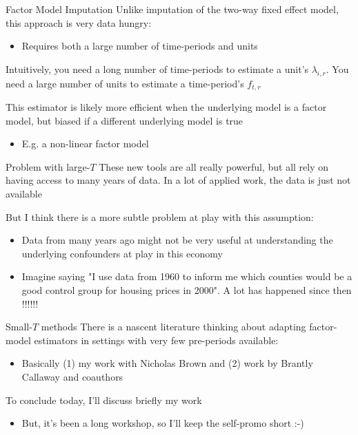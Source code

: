 \documentclass[t]{beamer}
\begin{document}
\begin{frame}{Factor Model Imputation}
  Unlike imputation of the two-way fixed effect model, this approach is very data hungry:
  \begin{itemize}
    \item Requires both a large number of time-periods and units
  \end{itemize}

  \bigskip
  Intuitively, you need a long number of time-periods to estimate a unit's $\lambda_{i,r}$. You need a large number of units to estimate a time-period's $f_{t,r}$

  \pause
  \bigskip
  This estimator is likely more efficient when the underlying model is a factor model, but biased if a different underlying model is true
  \begin{itemize}
    \item E.g. a non-linear factor model
  \end{itemize}
\end{frame}

\begin{frame}{Problem with large-$T$}
  These new tools are all really powerful, but all rely on having access to many years of data.
  In a lot of applied work, the data is just not available

  \pause
  \bigskip
  But I think there is a more subtle problem at play with this assumption:
  \begin{itemize}
    \item Data from many years ago might not be very useful at understanding the underlying confounders at play in this economy
    \item Imagine saying "I use data from 1960 to inform me which counties would be a good control group for housing prices in 2000". A lot has happened since then !!!!!!
  \end{itemize}
\end{frame}

\begin{frame}{Small-$T$ methods}
  There is a nascent literature thinking about adapting factor-model estimators in settings with very few pre-periods available:
  \begin{itemize}
    \item Basically (1) my work with Nicholas Brown and (2) work by Brantly Callaway and coauthors
  \end{itemize}

  \bigskip
  To conclude today, I'll discuss briefly my work
  \begin{itemize}
    \item But, it's been a long workshop, so I'll keep the self-promo short :-)
  \end{itemize}
\end{frame}
\end{document}
